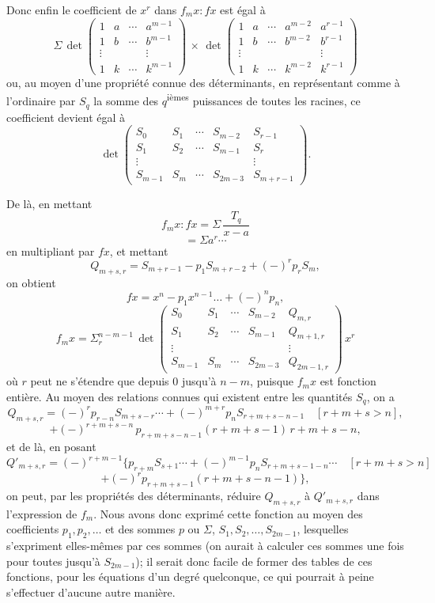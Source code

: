 \documentclass[12pt,a4paper]{article}
\begin{document}
Donc enfin le coefficient de $x^r$ dans $f_m x : fx$ est \'egal \`a
\[
\Sigma\,\det\begin{pmatrix} 1 & a & \cdots & a^{m-1} \\ 1 & b & \cdots & b^{m-1} \\ \vdots & & & \vdots \\ 1 & k & \cdots & k^{m-1} \end{pmatrix}\,\times\,\det\begin{pmatrix} 1 & a & \cdots & a^{m-2} & a^{r-1} \\ 1 & b & \cdots & b^{m-2} & b^{r-1} \\ \vdots & & & & \vdots \\ 1 & k & \cdots & k^{m-2} & k^{r-1} \end{pmatrix}
\]
ou, au moyen d'une propri\'et\'e connue des d\'eterminants, en repr\'esentant comme \`a l'ordinaire par $S_q$ la somme des $q$\textsuperscript{i\`emes} puissances de toutes les racines, ce coefficient devient \'egal \`a
\[
\det\begin{pmatrix} S_0 & S_1 & \cdots & S_{m-2} & S_{r-1} \\ S_1 & S_2 & \cdots & S_{m-1} & S_r \\ \vdots & & & & \vdots \\ S_{m-1} & S_m & \cdots & S_{2m-3} & S_{m+r-1} \end{pmatrix}.
\]

De l\`a, en mettant
\[
f_m x : fx = \Sigma\,\frac{T_q}{x - a}
\]
\[
= \Sigma a^{r}\cdots
\]
en multipliant par $fx$, et mettant
\[
Q_{m+s,r} = S_{m+r-1} - p_1 S_{m+r-2} + (-)^r p_r S_m,
\]
on obtient
\[
fx = x^n - p_1 x^{n-1}\ldots + (-)^n p_n,
\]
\[
f_m x = \Sigma_{r}^{n-m-1}\,\det\begin{pmatrix} S_0 & S_1 & \cdots & S_{m-2} & Q_{m,r} \\ S_1 & S_2 & \cdots & S_{m-1} & Q_{m+1,r} \\ \vdots & & & & \vdots \\ S_{m-1} & S_m & \cdots & S_{2m-3} & Q_{2m-1,r} \end{pmatrix}\,x^r
\]
o\`u $r$ peut ne s'\'etendre que depuis 0 jusqu'\`a $n - m$, puisque $f_m x$ est fonction enti\`ere. Au moyen des relations connues qui existent entre les quantit\'es $S_q$, on a
\[
Q_{m+s,r} = (-)^r p_{r-n} S_{m+s-r} \cdots + (-)^{m+r} p_n S_{r+m+s-n-1} \quad [r + m + s > n],
\]
\[
+ (-)^{r+m+s-n}\,p_{r+m+s-n-1}(r + m + s - 1)\,r + m + s - n,
\]
et de l\`a, en posant
\[
Q'_{m+s,r} = (-)^{r+m-1}\bigl\{p_{r+m} S_{s+1} \cdots + (-)^{m-1} p_n S_{r+m+s-1-n}\cdots\quad [r + m + s > n]
\]
\[
+ (-)^r p_{r+m+s-1}(r + m + s - n - 1)\bigr\},
\]
on peut, par les propri\'et\'es des d\'eterminants, r\'eduire $Q_{m+s,r}$ \`a $Q'_{m+s,r}$ dans l'expression de $f_m$. Nous avons donc exprim\'e cette fonction au moyen des coefficients $p_1, p_2, \ldots$ et des sommes $p$ ou $\Sigma$, $S_1, S_2, \ldots, S_{2m-1}$, lesquelles s'expriment elles-m\^emes par ces sommes (on aurait \`a calculer ces sommes une fois pour toutes jusqu'\`a $S_{2m-1}$); il serait donc facile de former des tables de ces fonctions, pour les \'equations d'un degr\'e quelconque, ce qui pourrait \`a peine s'effectuer d'aucune autre mani\`ere.
\end{document}
